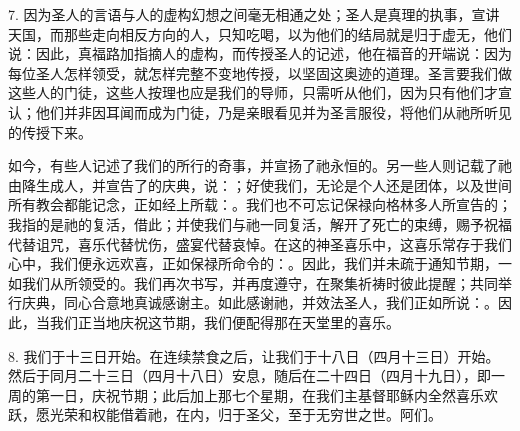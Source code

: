 7. 因为圣人的言语与人的虚构幻想之间毫无相通之处；圣人是真理的执事，宣讲天国，而那些走向相反方向的人，只知吃喝，以为他们的结局就是归于虚无，他们说：因此，真福路加指摘人的虚构，而传授圣人的记述，他在福音的开端说：因为每位圣人怎样领受，就怎样完整不变地传授，以坚固这奥迹的道理。圣言要我们做这些人的门徒，这些人按理也应是我们的导师，只需听从他们，因为只有他们才宣认；他们并非因耳闻而成为门徒，乃是亲眼看见并为圣言服役，将他们从祂所听见的传授下来。\par

如今，有些人记述了我们的所行的奇事，并宣扬了祂永恒的。另一些人则记载了祂由降生成人，并宣告了的庆典，说：；好使我们，无论是个人还是团体，以及世间所有教会都能记念，正如经上所载：。我们也不可忘记保禄向格林多人所宣告的；我指的是祂的复活，借此；并使我们与祂一同复活，解开了死亡的束缚，赐予祝福代替诅咒，喜乐代替忧伤，盛宴代替哀悼。在这的神圣喜乐中，这喜乐常存于我们心中，我们便永远欢喜，正如保禄所命令的：。因此，我们并未疏于通知节期，一如我们从所领受的。我们再次书写，并再度遵守，在聚集祈祷时彼此提醒；共同举行庆典，同心合意地真诚感谢主。如此感谢祂，并效法圣人，我们正如所说：。因此，当我们正当地庆祝这节期，我们便配得那在天堂里的喜乐。\par

8. 我们于十三日开始。在连续禁食之后，让我们于十八日（四月十三日）开始。然后于同月二十三日（四月十八日）安息，随后在二十四日（四月十九日），即一周的第一日，庆祝节期；此后加上那七个星期，在我们主基督耶稣内全然喜乐欢跃，愿光荣和权能借着祂，在内，归于圣父，至于无穷世之世。阿们。\par

